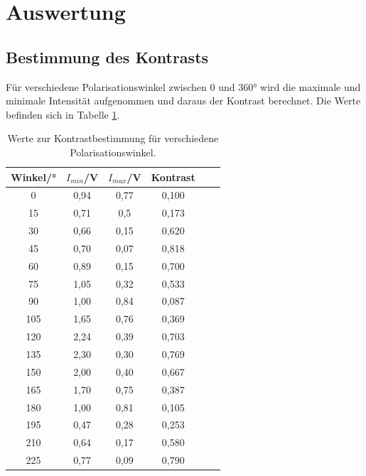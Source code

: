 \section{Auswertung}
\label{sec:Auswertung}

        \subsection{Bestimmung des Kontrasts}

            Für verschiedene Polarisationswinkel zwischen 0 und 360° wird die maximale und 
            minimale Intensität aufgenommen und daraus der Kontrast berechnet. 
            Die Werte befinden sich in Tabelle \ref{tab:kontrast}.

            \begin{table}
                \centering
                \caption{Werte zur Kontrastbestimmung für verschiedene Polarisationswinkel.}
                \label{tab:kontrast}
                \begin{tabular}{c c c c c c}
                    \toprule
                    Winkel/° & $I_{min}$/V & $I_{max}$/V & Kontrast\\
                    \midrule
                    0   & 0,94 & 0,77 & 0,100 \\ 
                    15  & 0,71 & 0,5  & 0,173 \\
                    30  & 0,66 & 0,15 & 0,620 \\
                    45  & 0,70  & 0,07 & 0,818 \\
                    60  & 0,89 & 0,15 & 0,700 \\
                    75  & 1,05 & 0,32 & 0,533 \\
                    90  & 1,00 & 0,84 & 0,087 \\
                    105 & 1,65 & 0,76 & 0,369 \\
                    120 & 2,24 & 0,39 & 0,703 \\
                    135 & 2,30 & 0,30  & 0,769 \\
                    150 & 2,00 & 0,40  & 0,667 \\
                    165 & 1,70 & 0,75 & 0,387 \\
                    180 & 1,00 & 0,81 & 0,105 \\
                    195 & 0,47 & 0,28 & 0,253 \\
                    210 & 0,64 & 0,17 & 0,580 \\
                    225 & 0,77 & 0,09 & 0,790 \\

\end{tabular}
\end{table}
